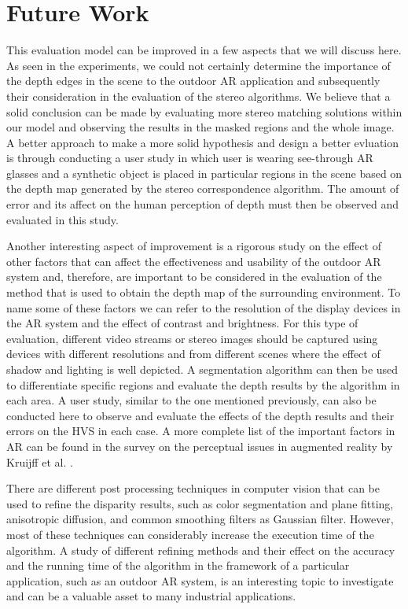 \section{Future Work}
This evaluation model can be improved in a few aspects that we will discuss here.
As seen in the experiments, we could not certainly determine the importance of the depth edges in the scene to the outdoor AR application and subsequently their consideration in the evaluation 
of the stereo algorithms. We believe that a solid conclusion can be made by evaluating more stereo matching solutions
within our model and observing the results in the masked regions and the whole image. A better approach to make a more solid hypothesis and design a better 
evluation is through conducting a user study in which user is wearing see-through AR glasses and a synthetic object is placed in particular regions in the scene based on the depth map generated by the stereo correspondence algorithm. The amount of error and its affect on the human perception of depth must then be observed and evaluated in this study. 

Another interesting aspect of improvement is a rigorous study on the effect of other factors that can affect the effectiveness and usability of the outdoor AR system and, therefore, 
are important to be considered in the evaluation of the method that is used to obtain the depth map of the surrounding environment. 
To name some of these factors we can refer to
the resolution of the display devices in the AR system and the effect of contrast and brightness. 
For this type of evaluation, different video streams or stereo images should be captured using devices with different resolutions 
and from different scenes where the effect of shadow and lighting is well depicted. A segmentation algorithm can then be used to 
differentiate specific regions and evaluate the depth results by the algorithm in each area. 
A user study, similar to the one mentioned previously, can also be conducted here to observe and evaluate the effects of the depth results and 
their errors on the HVS in each case.  
A more complete list of the important factors in AR can be
found in the survey on the perceptual issues in augmented reality by Kruijff et al. \cite{kru10}.

There are different post processing techniques in computer vision that can be used to refine the disparity results, such as color segmentation and plane fitting, 
anisotropic diffusion, and common smoothing filters as Gaussian filter. However, most of these techniques can considerably increase the execution time of the algorithm.
A study of different refining methods and their effect on the accuracy and the running time of the algorithm in the framework of a particular application, 
such as an outdoor AR system, is an interesting topic to investigate and can be a valuable asset to many industrial applications.

